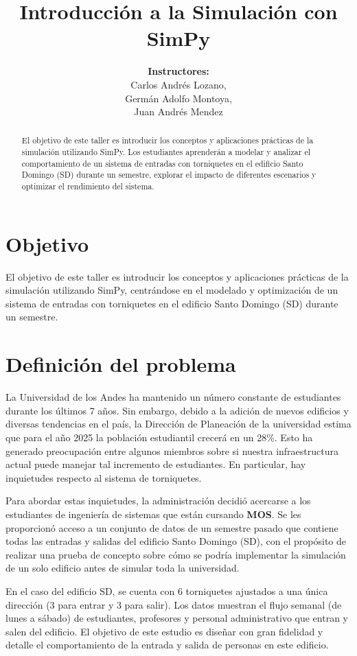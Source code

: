 \documentclass[12pt]{article}
\title{Introducción a la Simulación con SimPy}
\author{\textbf{Instructores:} \\
Carlos Andrés Lozano, \\
Germán Adolfo Montoya, \\
Juan Andrés Mendez}
\date{}
\begin{document}
\maketitle

\begin{abstract}
El objetivo de este taller es introducir los conceptos y aplicaciones prácticas de la simulación utilizando SimPy. Los estudiantes aprenderán a modelar y analizar el comportamiento de un sistema de entradas con torniquetes en el edificio Santo Domingo (SD) durante un semestre, explorar el impacto de diferentes escenarios y optimizar el rendimiento del sistema.
\end{abstract}

\section*{Objetivo}
El objetivo de este taller es introducir los conceptos y aplicaciones prácticas de la simulación utilizando SimPy, centrándose en el modelado y optimización de un sistema de entradas con torniquetes en el edificio Santo Domingo (SD) durante un semestre.


\section*{Definición del problema}

La Universidad de los Andes ha mantenido un número constante de estudiantes durante los últimos 7 años. Sin embargo, debido a la adición de nuevos edificios y diversas tendencias en el país, la Dirección de Planeación de la universidad estima que para el año 2025 la población estudiantil crecerá en un 28\%. Esto ha generado preocupación entre algunos miembros sobre si nuestra infraestructura actual puede manejar tal incremento de estudiantes. En particular, hay inquietudes respecto al sistema de torniquetes.

Para abordar estas inquietudes, la administración decidió acercarse a los estudiantes de ingeniería de sistemas que están cursando \textbf{MOS}. Se les proporcionó acceso a un conjunto de datos de un semestre pasado que contiene todas las entradas y salidas del edificio Santo Domingo (SD), con el propósito de realizar una prueba de concepto sobre cómo se podría implementar la simulación de un solo edificio antes de simular toda la universidad.

En el caso del edificio SD, se cuenta con 6 torniquetes ajustados a una única dirección (3 para entrar y 3 para salir). Los datos muestran el flujo semanal (de lunes a sábado) de estudiantes, profesores y personal administrativo que entran y salen del edificio. El objetivo de este estudio es diseñar con gran fidelidad y detalle el comportamiento de la entrada y salida de personas en este edificio.
\end{document}
